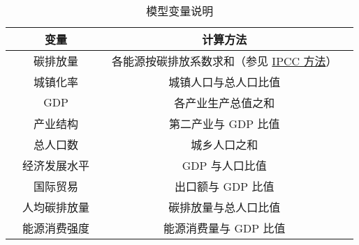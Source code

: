     \begin{table}[htb]
      \centering
      \caption{模型变量说明}
      \begin{tabular*}{0.618\paperwidth}{@{\extracolsep{\fill}}ccccc}
        \toprule[1.5pt]
        &变量 && 计算方法 &\\
        \midrule[1pt]
        &碳排放量 && 各能源按碳排放系数求和（参见 \hyperref[eq:IPCC]{IPCC 方法}） &\\
        &城镇化率 && 城镇人口与总人口比值 &\\
        &$\mathrm{GDP}$ && 各产业生产总值之和 &\\
        &产业结构 && 第二产业与 $\mathrm{GDP}$ 比值 &\\
        &总人口数 && 城乡人口之和 &\\
        &经济发展水平 && $\mathrm{GDP}$ 与人口比值 &\\
        &国际贸易 && 出口额与 $\mathrm{GDP}$ 比值 &\\
        &人均碳排放量 && 碳排放量与总人口比值 &\\
        &能源消费强度 && 能源消费量与 $\mathrm{GDP}$ 比值 &\\
        \bottomrule[1.5pt]
      \end{tabular*}
      \label{tab:bianliangshuoming}
    \end{table}